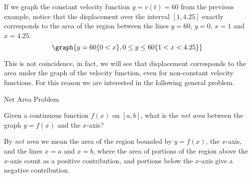 \documentclass{ximera}
\begin{document}
If we graph the constant velocity function $y=v(t)=60$ from the previous example, notice that the displacement over the interval $[1,4.25]$ exactly corresponds to the area of the region between the lines $y=60$, $y=0$, $x=1$ and $x=4.25$.
\[
\graph{y=60\{0< x\},0\leq y\leq 60\{1< x< 4.25\}}
\]

This is not coincidence, in fact, we will see that displacement corresponds to the area under the graph of the velocity function, even for non-constant velocity functions. For this reason we are interested in the following general problem.

\begin{problem}{Net Area Problem}

Given a continuous function $f(x)$ on $[a,b]$, what is the \emph{net area} between the graph $y=f(x)$ and the $x$-axis?

By \emph{net area} we mean the area of the region bounded by $y=f(x)$, the $x$-axis, and the lines $x=a$ and $x=b$, where the area of portions of the region above the $x$-axis count as a positive contribution, and portions below the $x$-axis give a negative contribution.
\end{problem}
\end{document}
